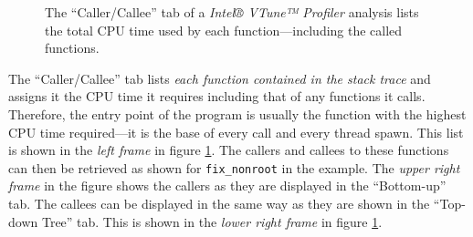 \begin{@empty}
    \setlength{\fboxsep}{0pt}%
    \setlength{\fboxrule}{1pt}%
    
    \begin{figure}[h!]
        \centering
        \vspace{.75em}
        \caption[Caller/Callee view of an analysis done by the VTune™ Profiler]{The ``Caller/Callee'' tab of a \textit{Intel® VTune™ Profiler} analysis lists the total CPU time used by each function---including the called functions.}
        \label{fig:vtunecallercallee}
    \end{figure}
\end{@empty}

    The ``Caller/Callee'' tab lists \emph{each function contained in the stack trace} and assigns it the CPU time it requires including that of any functions it calls. Therefore, the entry point of the program is usually the function with the highest CPU time required---it is the base of every call and every thread spawn. This list is shown in the \emph{left frame} in figure \ref{fig:vtunecallercallee}. The callers and callees to these functions can then be retrieved as shown for \lstinline|fix_nonroot| in the example. The \emph{upper right frame} in the figure shows the callers as they are displayed in the ``Bottom-up'' tab. The callees can be displayed in the same way as they are shown in the ``Top-down Tree'' tab. This is shown in the \emph{lower right frame} in figure \ref{fig:vtunecallercallee}.


